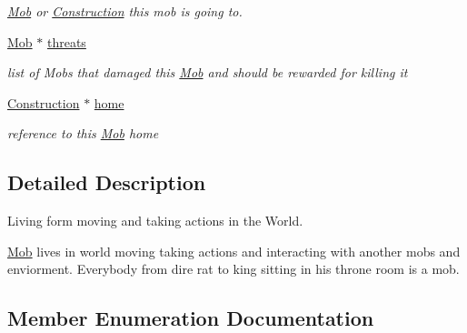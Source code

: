 \begin{DoxyCompactItemize}
\begin{DoxyCompactList}\small\item\em \hyperlink{class_mob}{Mob} or \hyperlink{class_construction}{Construction} this mob is going to. \end{DoxyCompactList}\item 
\hyperlink{class_mob}{Mob} $\ast$ \hyperlink{class_mob_a07f79a9fd434b9b26098b3b6d5d4a93e}{threats}\hypertarget{class_mob_a07f79a9fd434b9b26098b3b6d5d4a93e}{}\label{class_mob_a07f79a9fd434b9b26098b3b6d5d4a93e}

\begin{DoxyCompactList}\small\item\em list of Mobs that damaged this \hyperlink{class_mob}{Mob} and should be rewarded for killing it \end{DoxyCompactList}\item 
\hyperlink{class_construction}{Construction} $\ast$ \hyperlink{class_mob_ad3824bdc42d4041e184201c7801ab35e}{home}\hypertarget{class_mob_ad3824bdc42d4041e184201c7801ab35e}{}\label{class_mob_ad3824bdc42d4041e184201c7801ab35e}

\begin{DoxyCompactList}\small\item\em reference to this \hyperlink{class_mob}{Mob} home \end{DoxyCompactList}\end{DoxyCompactItemize}


\subsection{Detailed Description}
Living form moving and taking actions in the World. 

\hyperlink{class_mob}{Mob} lives in world moving taking actions and interacting with another mobs and enviorment. Everybody from dire rat to king sitting in his throne room is a mob. 

\subsection{Member Enumeration Documentation}
